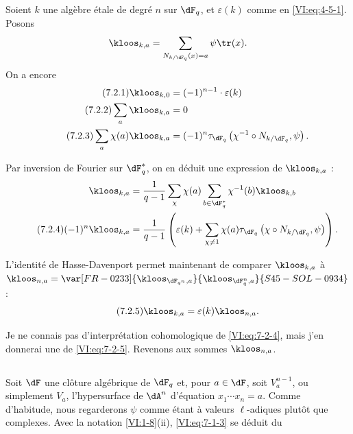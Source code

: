 \subsection{}\label{VI:7-2}

Soient $k$ une algèbre étale de degré $n$ sur $\dF_q$, et $\varepsilon(k)$ 
comme en \eqref{VI:eq:4-5-1}. Posons 
\[
  \kloos_{k,a} = \sum_{N_{k/\dF_q}(x)=a} \psi \tr(x) \text{.} 
\]
On a encore 
\begin{align*}\tag{7.2.1}\label{VI:eq:7-2-1}
  \kloos_{k,0} &= (-1)^{n-1} \cdot \varepsilon(k) \\ \tag{7.2.2}\label{VI:eq:7-2-2}
  \sum_a \kloos_{k,a} &= 0 \\ \tag{7.2.3}\label{VI:eq:7-2-3}
  \sum_a \chi(a) \kloos_{k,a} &= (-1)^n \tau_{\dF_q}\left(\chi^{-1}\circ N_{k/\dF_q},\psi\right) \text{.} 
\end{align*}

Par inversion de Fourier sur $\dF_q^\ast$, on en déduit une expression de 
$\kloos_{k,a}$ : 
\begin{align*} 
  \kloos_{k,a} &= \frac{1}{q-1} \sum_\chi \chi(a) \sum_{b\in \dF_q^\ast} \chi^{-1}(b) \kloos_{k,b} \\ \tag{7.2.4}\label{VI:eq:7-2-4}
  (-1)^n \kloos_{k,a} &= \frac{1}{q-1} \left(\varepsilon(k) + \sum_{\chi\ne 1} \chi(a) \tau_{\dF_q}\left(\chi\circ N_{k/\dF_q},\psi\right) \right) \text{.} 
\end{align*}

L'identité de Hasse-Davenport permet maintenant de comparer $\kloos_{k,a}$ 
à $\kloos_{n,a} = \var[FR-0233]{\kloos_{\dF_{q^n},a}}{\kloos_{\dF_q^n,a}}{S45-SOL-0934}$: 
\begin{equation*}\tag{7.2.5}\label{VI:eq:7-2-5}
  \kloos_{k,a} = \varepsilon(k) \kloos_{n,a} \text{.} 
\end{equation*}

Je ne connais pas d'interprétation cohomologique de \eqref{VI:eq:7-2-4}, mais 
j'en donnerai une de \eqref{VI:eq:7-2-5}. Revenons aux sommes $\kloos_{n,a}$. 





\subsection{}\label{VI:7-3}

Soit $\dF$ une clôture algébrique de $\dF_q$ et, pour $a\in \dF$, soit 
$V_a^{n-1}$, ou simplement $V_a$, l'hypersurface de $\dA^n$ d'équation 
$x_1 \dotsm x_n=a$. Comme d'habitude, nous regarderons $\psi$ comme étant à 
valeurs $\ell$-adiques plutôt que complexes. Avec la notation 
\ref{VI:1-8}(ii), \eqref{VI:eq:7-1-3} se déduit du 





